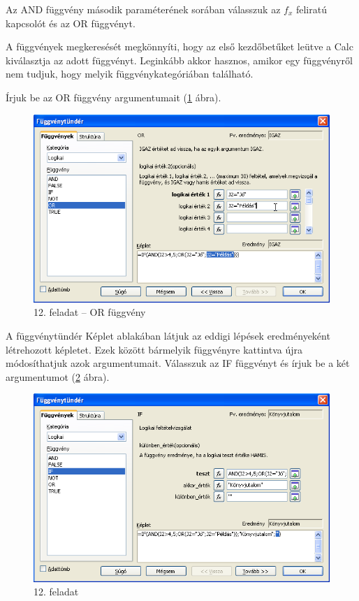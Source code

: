 Az AND függvény második paraméterének sorában válasszuk az
$f_x$ feliratú kapcsolót és az OR függvényt.

A függvények megkeresését megkönnyíti, hogy az első
kezdőbetűket leütve a Calc kiválasztja az adott
függvényt. Leginkább akkor hasznos, amikor egy
függvényről nem tudjuk, hogy melyik függvénykategóriában található.

Írjuk be az OR függvény argumentumait (\ref{12-feladatOR} ábra).

\begin{figure}[!h]
\begin{center}
\includegraphics[width=13.999cm]{oocalcv1-img70.png}
\caption{12.  feladat --  OR függvény}\label{12-feladatOR}
\end{center}
\end{figure}

A függvénytündér Képlet ablakában látjuk az eddigi
lépések eredményeként létrehozott képletet. Ezek között
bármelyik függvényre kattintva újra módosíthatjuk azok
argumentumait. Válasszuk az IF függvényt és írjuk be a két
argumentumot (\ref{12-feladatIFArg} ábra).

\begin{figure}[!h]
\begin{center}
\includegraphics[width=13.999cm]{oocalcv1-img71.png}
\caption{12. feladat}\label{12-feladatIFArg}
\end{center}
\end{figure}

